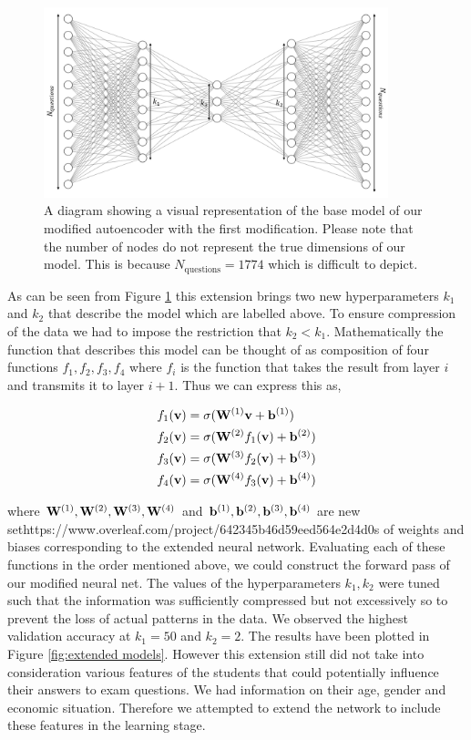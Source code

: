 \documentclass{article}
\begin{document}
\begin{figure}[H]
    \centering
    \includegraphics[width=10cm]{modified encoder.png}
    \caption{A diagram showing a visual representation of the base model of our modified autoencoder with the first modification. Please note that the number of nodes do not represent the true dimensions of our model. This is because $N_{\text{questions}}=1774$ which is difficult to depict.}
    \label{fig:modified autoencoder}
\end{figure}

As can be seen from Figure \ref{fig:modified autoencoder} this extension brings two new hyperparameters $k_1$ and $k_2$ that describe the model which are labelled above. To ensure compression of the data we had to impose the restriction that $k_2<k_1$. Mathematically the function that describes this model can be thought of as composition of four functions $f_1, f_2, f_3, f_4$ where $f_i$ is the function that takes the result from layer $i$ and transmits it to layer $i+1$. Thus we can express this as,

\begin{align}
    f_1(\bold{v}) &= \sigma(\bold{W}^{(1)}\bold{v}+\bold{b}^{(1)})\\
    f_2(\bold{v}) &= \sigma(\bold{W}^{(2)}f_1(\bold{v})+\bold{b}^{(2)})\\
    f_3(\bold{v}) &= \sigma(\bold{W}^{(3)}f_2(\bold{v})+\bold{b}^{(3)})\\
    f_4(\bold{v}) &= \sigma(\bold{W}^{(4)}f_3(\bold{v})+\bold{b}^{(4)})
    \label{eqn:modified neural net function}
\end{align}
    
where $\bold{W}^{(1)}, \bold{W}^{(2)}, \bold{W}^{(3)},\bold{W}^{(4)}$ and $\bold{b}^{(1)}, \bold{b}^{(2)}, \bold{b}^{(3)},\bold{b}^{(4)}$ are new sethttps://www.overleaf.com/project/642345b46d59eed564e2d4d0s of weights and biases corresponding to the extended neural network.  Evaluating each of these functions in the order mentioned above, we could construct the forward pass of our modified neural net. The values of the hyperparameters $k_1, k_2$ were tuned such that the information was sufficiently compressed but not excessively so to prevent the loss of actual patterns in the data. We observed the highest validation accuracy at $k_1= 50$ and $k_2=2$. The results have been plotted in Figure \ref{fig:extended models}. However this extension still did not take into consideration various features of the students that could potentially influence their answers to exam questions. We had information on their age, gender and economic situation. Therefore we attempted to extend the network to include these features in the learning stage.
\end{document}
